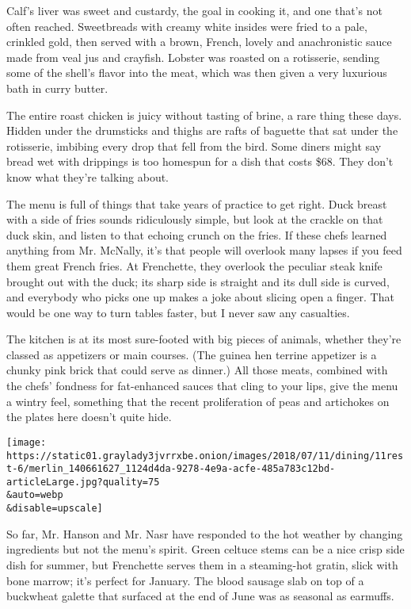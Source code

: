 Calf's liver was sweet and custardy, the goal in cooking it, and one
that's not often reached. Sweetbreads with creamy white insides were
fried to a pale, crinkled gold, then served with a brown, French, lovely
and anachronistic sauce made from veal jus and crayfish. Lobster was
roasted on a rotisserie, sending some of the shell's flavor into the
meat, which was then given a very luxurious bath in curry butter.

The entire roast chicken is juicy without tasting of brine, a rare thing
these days. Hidden under the drumsticks and thighs are rafts of baguette
that sat under the rotisserie, imbibing every drop that fell from the
bird. Some diners might say bread wet with drippings is too homespun for
a dish that costs \$68. They don't know what they're talking about.

The menu is full of things that take years of practice to get right.
Duck breast with a side of fries sounds ridiculously simple, but look at
the crackle on that duck skin, and listen to that echoing crunch on the
fries. If these chefs learned anything from Mr. McNally, it's that
people will overlook many lapses if you feed them great French fries. At
Frenchette, they overlook the peculiar steak knife brought out with the
duck; its sharp side is straight and its dull side is curved, and
everybody who picks one up makes a joke about slicing open a finger.
That would be one way to turn tables faster, but I never saw any
casualties.

The kitchen is at its most sure-footed with big pieces of animals,
whether they're classed as appetizers or main courses. (The guinea hen
terrine appetizer is a chunky pink brick that could serve as dinner.)
All those meats, combined with the chefs' fondness for fat-enhanced
sauces that cling to your lips, give the menu a wintry feel, something
that the recent proliferation of peas and artichokes on the plates here
doesn't quite hide.

\texttt{[image: https://static01.graylady3jvrrxbe.onion/images/2018/07/11/dining/11rest-6/merlin\_140661627\_1124d4da-9278-4e9a-acfe-485a783c12bd-articleLarge.jpg?quality=75\\\&auto=webp\\\&disable=upscale]}

So far, Mr. Hanson and Mr. Nasr have responded to the hot weather by
changing ingredients but not the menu's spirit. Green celtuce stems can
be a nice crisp side dish for summer, but Frenchette serves them in a
steaming-hot gratin, slick with bone marrow; it's perfect for January.
The blood sausage slab on top of a buckwheat galette that surfaced at
the end of June was as seasonal as earmuffs.

